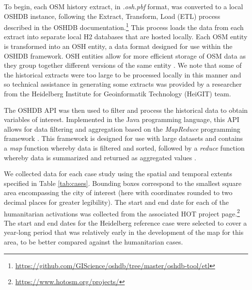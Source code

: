 To begin, each OSM history extract, in \textit{.osh.pbf} format, was converted to a local OSHDB instance, following the Extract, Transform, Load (ETL) process described in the OSHDB documentation.\footnote{\url{https://github.com/GIScience/oshdb/tree/master/oshdb-tool/etl}} This process loads the data from each extract into separate local H2 databases that are hosted locally. Each OSM entity is transformed into an OSH entity, a data format designed for use within the OSHDB framework. OSH entities allow for more efficient storage of OSM data as they group together different versions of the same entity \parencite{raifer_oshdb_2019}. We note that some of the historical extracts were too large to be processed locally in this manner and so technical assistance in generating some extracts was provided by a researcher from the Heidelberg Institute for Geoinformatik Technology (HeiGIT) team. 

The OSHDB API \parencite{raifer_oshdb_2019} was then used to filter and process the historical data to obtain variables of interest.  Implemented in the Java programming language, this API allows for data filtering and aggregation based on the \textit{MapReduce} programming framework \parencite{raifer_oshdb_2019}. This framework is designed for use with large datasets and contains a \textit{map} function whereby data is filtered and sorted, followed by a \textit{reduce} function whereby data is summarized and returned as aggregated values \parencite{dean_mapreduce_2008}.

We collected data for each case study using the spatial and temporal extents specified in Table \ref{tab:cases}. Bounding boxes correspond to the smallest square area encompassing the city of interest (here with coordinates rounded to two decimal places for greater legibility). The start and end date for each of the humanitarian activations was collected from the associated HOT project page.\footnote{\url{https://www.hotosm.org/projects/}} The start and end dates for the Heidelberg reference case were selected to cover a year-long period that was relatively early in the development of the map for this area, to be better compared against the humanitarian cases. 

